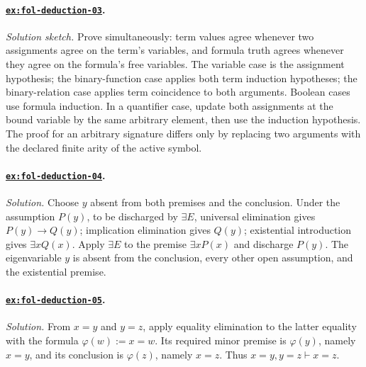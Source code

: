 \documentclass[11pt,oneside,openany]{book}
\theoremstyle{definition}
\theoremstyle{plain}
\theoremstyle{remark}
\newcommand{\derives}{\vdash}
\newcommand{\defeq}{\mathrel{:=}}
\begin{document}
\paragraph{\hyperref[ex:fol-deduction-03]{\texttt{ex:fol-deduction-03}}.}
\textit{Solution sketch.}  Prove simultaneously: term values agree whenever
two assignments agree on the term's variables, and formula truth agrees
whenever they agree on the formula's free variables.  The variable case is the
assignment hypothesis; the binary-function case applies both term induction
hypotheses; the binary-relation case applies term coincidence to both
arguments.  Boolean cases use formula induction.  In a quantifier case, update
both assignments at the bound variable by the same arbitrary element, then use
the induction hypothesis.  The proof for an arbitrary signature differs only
by replacing two arguments with the declared finite arity of the active symbol.

\paragraph{\hyperref[ex:fol-deduction-04]{\texttt{ex:fol-deduction-04}}.}
\textit{Solution.}  Choose \(y\) absent from both premises and the conclusion.
Under the assumption \(P(y)\), to be discharged by \(\exists E\),
universal elimination gives
\(P(y)\to Q(y)\); implication elimination gives \(Q(y)\); existential
introduction gives \(\exists xQ(x)\).  Apply \(\exists E\) to the premise
\(\exists xP(x)\) and discharge \(P(y)\).  The eigenvariable \(y\) is absent
from the conclusion, every other open assumption, and the existential premise.

\paragraph{\hyperref[ex:fol-deduction-05]{\texttt{ex:fol-deduction-05}}.}
\textit{Solution.}  From \(x=y\) and \(y=z\), apply equality elimination to
the latter equality with the formula \(\varphi(w)\defeq x=w\).  Its required
minor premise is \(\varphi(y)\), namely \(x=y\), and its conclusion is
\(\varphi(z)\), namely \(x=z\).  Thus \(x=y,y=z\derives x=z\).
\end{document}
